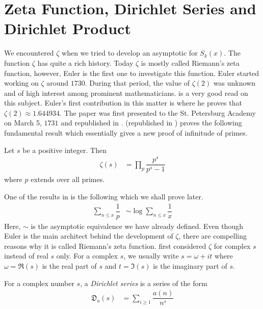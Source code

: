 \documentclass[elemannt.tex]{subfile}
\begin{document}
	\section{Zeta Function, Dirichlet Series and Dirichlet Product}\label{sec:zeta}
	We encountered $\zeta$ when we tried to develop an asymptotic for $S_{k}(x)$. The function $\zeta$ has quite a rich history. Today $\zeta$ is mostly called Riemann's zeta function, however, Euler is the first one to investigate this function. Euler started working on $\zeta$ around $1730$. During that period, the value of $\zeta(2)$ was unknown and of high interest among prominent mathematicians. \textcite{ayoub_1974} is a very good read on this subject. Euler's first contribution in this matter is \textcite{euler_1738} where he proves that $\zeta(2)\approx 1.644934$. The paper was first presented to the St. Petersburg Academy on March 5, $1731$ and republished in \textcite{euler_2020_a}. \textcite{euler_1744} (republished in \textcite{euler_2020_b}) proves the following fundamental result which essentially gives a new proof of infinitude of primes.
		\begin{theorem}
			Let $s$ be a positive integer. Then
				\begin{align*}
					\zeta(s)
						& = \prod_{p}\dfrac{p^{s}}{p^{s}-1}
				\end{align*}
			where $p$ extends over all primes.
		\end{theorem}
	One of the results in \textcite{euler_1744} is the following which we shall prove later.
		\begin{align*}
			\sum_{n\leq x}\dfrac{1}{p}
			& \sim \log{\sum_{n\leq x}\dfrac{1}{x}}
		\end{align*}
	Here, $\sim$ is the asymptotic equivalence we have already defined. Even though Euler is the main architect behind the development of $\zeta$, there are compelling reasons why it is called Riemann's zeta function. \textcite{riemann_1859} first considered $\zeta$ for complex $s$ instead of real $s$ only. For a complex $s$, we usually write $s=\omega+it$ where $\omega=\Re(s)$ is the real part of $s$ and $t=\Im(s)$ is the imaginary part of $s$.
		\begin{definition}
			For a complex number $s$, a \textit{Dirichlet series} is a series of the form
				\begin{align*}
					\mathfrak{D}_{a}(s)
						& = \sum_{i\geq 1}\dfrac{a(n)}{n^{s}}
				\end{align*}
		\end{definition}
\end{document}

